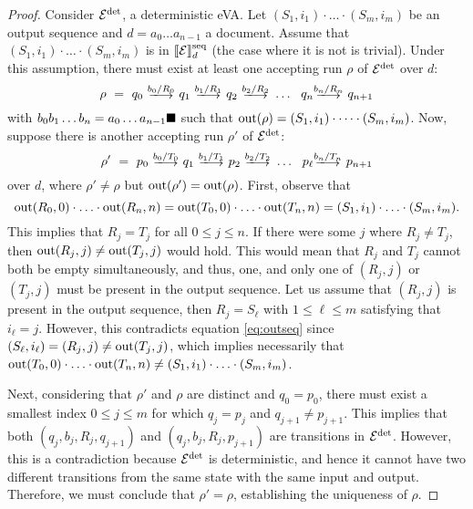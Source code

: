 \begin{proof}
	Consider $\mathcal{E}^{{\operatorname{det}}}$, a deterministic eVA. Let $(S_1, i_1)\cdot \ldots
	\cdot (S_m, i_m)$ be an output sequence and $d = a_0\ldots a_{n-1}$ a
	document. Assume that $(S_1, i_1)\cdot \ldots \cdot (S_m, i_m)$ is in
	$\llbracket\mathcal{E}\rrbracket^{\operatorname{seq}}_d$ (the case where it is not is trivial). Under this
	assumption, there must exist at least one accepting run $\rho$ of
	$\mathcal{E}^{{\operatorname{det}}}$ over $d$:
$$
\rho \ = \ q_0 \ \longtrans{b_0 / R_0} \ q_1 \ \longtrans{b_1 / R_1} \ q_2 \ \longtrans{b_2 / R_2} \ \ldots \ \ q_{n} \longtrans{b_{n} / R_n} \ q_{n+1}
$$
with $b_0b_1\ldots b_n = a_0\ldots a_{n-1} \blacksquare$ such that $\operatorname{out}(\rho) =
(S_1, i_1)\cdot \cdots \cdot (S_m, i_m)$. Now, suppose there is another
accepting run $\rho'$ of $\mathcal{E}^{{\operatorname{det}}}$:
$$
\rho' \ = \ p_0 \ \longtrans{b_0 / T_0} \ q_1 \ \longtrans{b_1 / T_1} \ p_2 \ \longtrans{b_2 / T_2} \ \ldots \ \ p_{\ell} \longtrans{b_n / T_n} \ p_{n+1}
$$
over $d$, where $\rho' \neq \rho$ but $\operatorname{out}(\rho') = \operatorname{out}(\rho)$. First,
observe that
\begin{equation} \label{eq:outseq}
\operatorname{out}(R_0, 0)\cdot \ldots \cdot \operatorname{out}(R_n, n) = \operatorname{out}(T_0, 0)\cdot \ldots \cdot \operatorname{out}(T_n, n) = (S_1, i_1)\cdot \ldots \cdot (S_m, i_m).
\end{equation}
This implies that $R_j = T_j$ for all $0 \leq j \leq n$. If there were some $j$
where $R_j \neq T_j$, then $\operatorname{out}(R_j, j) \neq \operatorname{out}(T_j, j)$ would hold. This
would mean that $R_j$ and $T_j$ cannot both be empty simultaneously, and thus,
one, and only one of $(R_j, j)$ or $(T_j, j)$ must be present in the output
sequence. Let us assume that $(R_j, j)$ is present in the output sequence, then
$R_j = S_\ell$ with $1 \leq \ell \leq m$ satisfying that $i_\ell = j$. However,
this contradicts equation \eqref{eq:outseq} since $(S_\ell, i_\ell) = (R_j, j)
\neq \operatorname{out}(T_j, j)$, which implies necessarily that $\operatorname{out}(T_0, 0)\cdot \ldots
\cdot \operatorname{out}(T_n, n) \neq (S_1, i_1) \cdot \ldots \cdot  (S_m, i_m)$.

Next, considering that $\rho'$ and $\rho$ are distinct and $q_0 = p_0$, there
must exist a smallest index $0 \leq j \leq m$ for which $q_j = p_j$ and $q_{j+1}
\neq p_{j+1}$. This implies that both $(q_j, b_j, R_j, q_{j+1})$ and $(q_j, b_j,
R_j, p_{j+1})$ are transitions in $\mathcal{E}^{\operatorname{det}}$. However, this is a contradiction
because $\mathcal{E}^{{\operatorname{det}}}$ is deterministic, and hence it cannot have two different
transitions from the same state with the same input and output. Therefore, we
must conclude that $\rho' = \rho$, establishing the uniqueness of $\rho$.
\end{proof}

